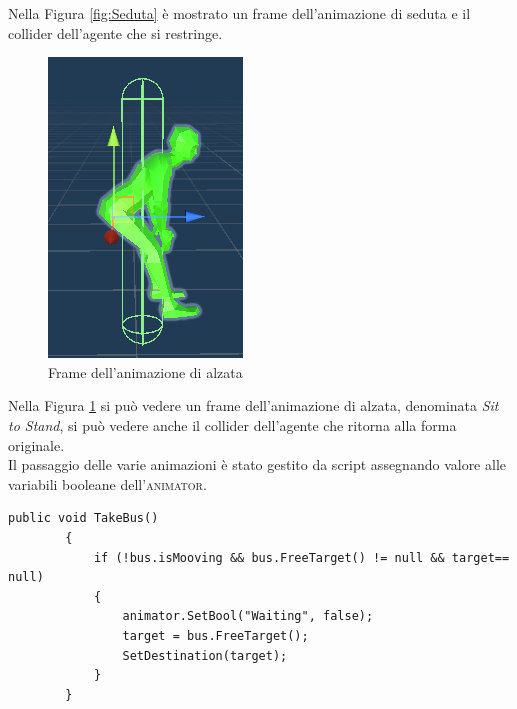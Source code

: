\documentclass[12pt, openany]{book}
\begin{document}
	Nella Figura \ref{fig:Seduta} è mostrato un frame dell'animazione di seduta e il collider dell'agente che si restringe.
	\begin{figure}[H]
		\centering
		\includegraphics[width=0.8\linewidth]{"Immagini/inPiedi.png"}
		\caption{Frame dell'animazione di alzata}
		\label{fig:Alzata}
	\end{figure}
	Nella Figura \ref{fig:Alzata} si può vedere un frame dell'animazione di alzata, denominata \emph{Sit to Stand}, si può vedere anche il collider dell'agente che ritorna alla forma originale.\\
	Il passaggio delle varie animazioni è stato gestito da script assegnando valore alle variabili booleane dell'\textsc{animator}.
	\begin{lstlisting}[language={[Sharp]C}, 
		caption={Metodo che permette agli agenti di prendere posto sull'autobus}, label={TakeBus}]
		public void TakeBus()
		{
			if (!bus.isMooving && bus.FreeTarget() != null && target== null)
			{
				animator.SetBool("Waiting", false);
				target = bus.FreeTarget();
				SetDestination(target);
			}
		}
	\end{lstlisting}	
\end{document}

